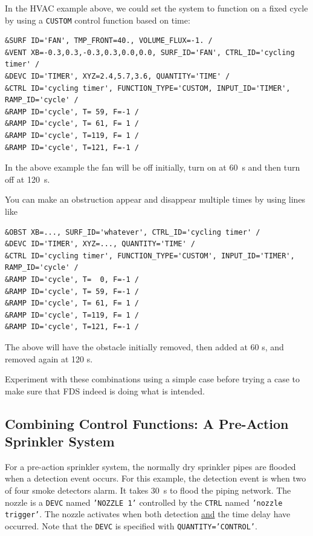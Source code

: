 \documentclass[11pt]{book}
\newcommand{\ct}{\tt\small}
\begin{document}
\noindent
In the HVAC
example above, we could set the system to function
on a fixed cycle by using a {\ct CUSTOM} control function based on time:

\footnotesize
\begin{verbatim}
&SURF ID='FAN', TMP_FRONT=40., VOLUME_FLUX=-1. /
&VENT XB=-0.3,0.3,-0.3,0.3,0.0,0.0, SURF_ID='FAN', CTRL_ID='cycling timer' /
&DEVC ID='TIMER', XYZ=2.4,5.7,3.6, QUANTITY='TIME' /
&CTRL ID='cycling timer', FUNCTION_TYPE='CUSTOM, INPUT_ID='TIMER', RAMP_ID='cycle' /
&RAMP ID='cycle', T= 59, F=-1 /
&RAMP ID='cycle', T= 61, F= 1 /
&RAMP ID='cycle', T=119, F= 1 /
&RAMP ID='cycle', T=121, F=-1 /
\end{verbatim} \normalsize

\noindent
In the above example the fan will be off initially, turn on at 60~s and then turn off at 120~s.

You can make an obstruction appear and disappear multiple times by using lines like

\footnotesize
\begin{verbatim}
&OBST XB=..., SURF_ID='whatever', CTRL_ID='cycling timer' /
&DEVC ID='TIMER', XYZ=..., QUANTITY='TIME' /
&CTRL ID='cycling timer', FUNCTION_TYPE='CUSTOM', INPUT_ID='TIMER', RAMP_ID='cycle' /
&RAMP ID='cycle', T=  0, F=-1 /
&RAMP ID='cycle', T= 59, F=-1 /
&RAMP ID='cycle', T= 61, F= 1 /
&RAMP ID='cycle', T=119, F= 1 /
&RAMP ID='cycle', T=121, F=-1 /
\end{verbatim}

\normalsize
\noindent
The above will have the obstacle initially removed, then added at 60 s, and removed again at 120 s.

Experiment with these combinations using a simple
case before trying a case to make sure that FDS indeed is doing what is intended.


\subsection{Combining Control Functions: A Pre-Action Sprinkler System}

For a pre-action sprinkler system, the normally
dry sprinkler pipes are flooded when a detection event occurs. For this example, the detection event is
when two of four smoke detectors alarm.  It takes 30~s to flood the piping network.
The nozzle is a {\ct DEVC} named {\ct 'NOZZLE 1'} controlled by the {\ct CTRL} named {\ct 'nozzle trigger'}.
The nozzle activates when both detection \underline{and} the time delay have occurred.  Note that the {\ct DEVC} is
specified with {\ct QUANTITY='CONTROL'}.
\end{document}
